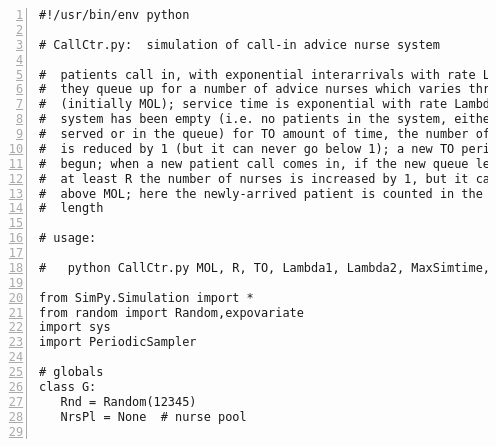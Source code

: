\documentclass[11pt]{article}
\begin{document}
\begin{Verbatim}[fontsize=\relsize{-2},numbers=left]
#!/usr/bin/env python

# CallCtr.py:  simulation of call-in advice nurse system

#  patients call in, with exponential interarrivals with rate Lambda1;
#  they queue up for a number of advice nurses which varies through time
#  (initially MOL); service time is exponential with rate Lambda2; if the
#  system has been empty (i.e. no patients in the system, either being
#  served or in the queue) for TO amount of time, the number of nurses
#  is reduced by 1 (but it can never go below 1); a new TO period is then
#  begun; when a new patient call comes in, if the new queue length is
#  at least R the number of nurses is increased by 1, but it cannot go
#  above MOL; here the newly-arrived patient is counted in the queue
#  length

# usage:  

#   python CallCtr.py MOL, R, TO, Lambda1, Lambda2, MaxSimtime, Debug

from SimPy.Simulation import *
from random import Random,expovariate
import sys
import PeriodicSampler

# globals
class G:
   Rnd = Random(12345)
   NrsPl = None  # nurse pool


\end{Verbatim}
\end{document}

